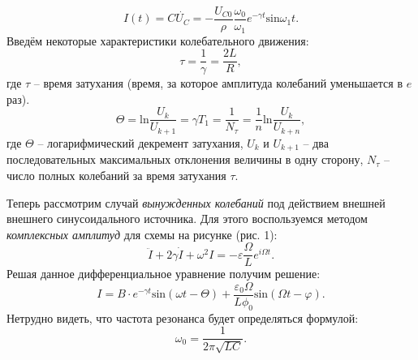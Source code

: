 \documentclass[a4paper, 12pt]{article}
\begin{document}
            \begin{equation}
                I(t) = C\dot{U_C}= - \frac{U_{C0}}{\rho} \frac{\omega_0}{\omega_1} e^{-\gamma t} \text{sin} \omega_1 t.
            \end{equation}
            Введём некоторые характеристики колебательного движения:
            \begin{equation}
                \tau = \frac{1}{\gamma} = \frac{2L}{R},
            \end{equation}
            где $\tau$ -- время затухания (время, за которое амплитуда колебаний уменьшается в $e$ раз).
            \begin{equation}
                \Theta = \text{ln} \frac{U_k}{U_{k+1}} = \gamma T_1 = \frac{1}{N_\tau} = \frac{1}{n} \text{ln} \frac{U_k}{U_{k+n}},
            \end{equation}
            где $\Theta$ -- логарифмический декремент затухания, $U_k$ и $U_{k+1}$ -- два последовательных максимальных отклонения величины в одну сторону, $N_\tau$ -- число полных колебаний за время затухания $\tau$.

            Теперь рассмотрим случай \textit{вынужденных колебаний} под действием внешней внешнего синусоидального источника. Для этого воспользуемся методом \textit{комплексных амплитуд} для схемы на рисунке (рис. 1):
            \begin{equation}
                \ddot{I} + 2 \gamma \dot{I} + \omega^2 I = - \varepsilon \frac{\Omega}{L} e^{i\Omega t}.
            \end{equation}
            Решая данное дифференциальное уравнение получим решение:
            \begin{equation}
                I = B\cdot e^{-\gamma t} \text{sin}(\omega t - \Theta) + \frac{\varepsilon_0 \Omega}{L \phi_0} \text{sin} (\Omega t - \varphi).
            \end{equation}
            Нетрудно видеть, что частота резонанса будет определяться формулой:
            \begin{equation}
                \omega_0 = \frac{1}{2 \pi \sqrt{LC}}.
            \end{equation}
\end{document}
